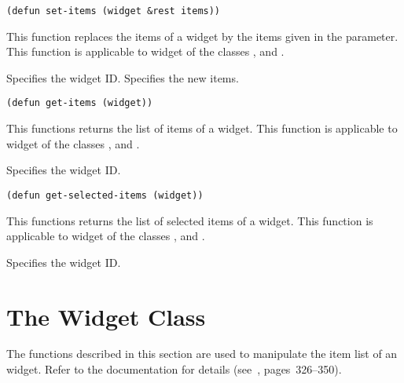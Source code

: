 \begin{lispd}
\syntax\begin{verbatim}
(defun set-items (widget &rest items))
\end{verbatim}
\beschr This function replaces the items of a widget by the items given
in the  parameter. This function is applicable to widget of the
classes ,  and .
\parameter
\begin{paramd}
 Specifies the widget ID.
 Specifies the new items.
\end{paramd}
\end{lispd}

\begin{lispd}
\syntax\begin{verbatim}
(defun get-items (widget))
\end{verbatim}
\beschr This functions returns the list of items of a widget.  This function
is applicable to widget of the classes ,  and
. 
\parameter
\begin{paramd}
 Specifies the widget ID.
\end{paramd}
\end{lispd}

\begin{lispd}
\syntax\begin{verbatim}
(defun get-selected-items (widget))
\end{verbatim}
\beschr This functions returns the list of selected items of a widget.  This 
function is applicable to widget of the classes , 
 and . 
\parameter
\begin{paramd}
 Specifies the widget ID.
\end{paramd}
\end{lispd}

\section{The  Widget Class}

The functions described in this section are used to manipulate the item list
of an  widget. Refer to the documentation for 
details (see~\cite{motif-prog-ref}, pages~326--350). 

